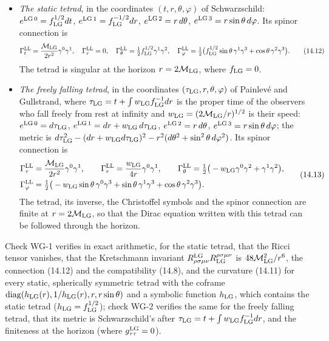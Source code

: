 \documentclass[
  10pt,
]{article}
\providecommand{\tightlist}{%
  \setlength{\itemsep}{0pt}\setlength{\parskip}{0pt}}
\begin{document}
\begin{itemize}
\tightlist
\item
  \emph{The static tetrad}, in the coordinates \((t,r,\theta,\varphi)\)
  of Schwarzschild: \(e^{{\rm LG}\,0}=f_{\rm LG}^{1/2}dt\),
  \(e^{{\rm LG}\,1}=f_{\rm LG}^{-1/2}dr\),
  \(e^{{\rm LG}\,2}=r\,d\theta\),
  \(e^{{\rm LG}\,3}=r\sin\theta\,d\varphi\). Its spinor connection is
  \[\Gamma^{\rm LL}_t=\frac{\mathcal M_{\rm LG}}{2r^2}\gamma^0\gamma^1,\quad\Gamma^{\rm LL}_r=0,\quad\Gamma^{\rm LL}_\theta=\tfrac12f_{\rm LG}^{1/2}\gamma^1\gamma^2,\quad\Gamma^{\rm LL}_\varphi=\tfrac12\big(f_{\rm LG}^{1/2}\sin\theta\,\gamma^1\gamma^3+\cos\theta\,\gamma^2\gamma^3\big).\tag{14.12}\]
  The tetrad is singular at the horizon \(r=2\mathcal M_{\rm LG}\),
  where \(f_{\rm LG}=0\).
\item
  \emph{The freely falling tetrad}, in the coordinates
  \((\tau_{\rm LG},r,\theta,\varphi)\) of Painlevé and Gullstrand, where
  \(\tau_{\rm LG}=t+\int w_{\rm LG}f_{\rm LG}^{-1}dr\) is the proper
  time of the observers who fall freely from rest at infinity and
  \(w_{\rm LG}=(2\mathcal M_{\rm LG}/r)^{1/2}\) is their speed:
  \(e^{{\rm LG}\,0}=d\tau_{\rm LG}\),
  \(e^{{\rm LG}\,1}=dr+w_{\rm LG}\,d\tau_{\rm LG}\),
  \(e^{{\rm LG}\,2}=r\,d\theta\),
  \(e^{{\rm LG}\,3}=r\sin\theta\,d\varphi\); the metric is
  \(d\tau_{\rm LG}^2-(dr+w_{\rm LG}d\tau_{\rm LG})^2-r^2(d\theta^2+\sin^2\theta\,d\varphi^2)\).
  Its spinor connection is
  \[\begin{aligned}&\Gamma^{\rm LL}_\tau=\frac{\mathcal M_{\rm LG}}{2r^2}\gamma^0\gamma^1,\qquad\Gamma^{\rm LL}_r=\frac{w_{\rm LG}}{4r}\gamma^0\gamma^1,\qquad\Gamma^{\rm LL}_\theta=\tfrac12\big(-w_{\rm LG}\gamma^0\gamma^2+\gamma^1\gamma^2\big),\\&\Gamma^{\rm LL}_\varphi=\tfrac12\big(-w_{\rm LG}\sin\theta\,\gamma^0\gamma^3+\sin\theta\,\gamma^1\gamma^3+\cos\theta\,\gamma^2\gamma^3\big).\end{aligned}\tag{14.13}\]
  The tetrad, its inverse, the Christoffel symbols and the spinor
  connection are finite at \(r=2\mathcal M_{\rm LG}\), so that the Dirac
  equation written with this tetrad can be followed through the horizon.
\end{itemize}

Check WG-1 verifies in exact arithmetic, for the static tetrad, that the
Ricci tensor vanishes, that the Kretschmann invariant
\(R^{\rm LG}_{\rho\sigma\mu\nu}R_{\rm LG}^{\rho\sigma\mu\nu}\) is
\(48\mathcal M_{\rm LG}^2/r^6\), the connection (14.12) and the
compatibility (14.8), and the curvature (14.11) for every static,
spherically symmetric tetrad with the coframe
\(\mathrm{diag}(h_{\rm LG}(r),1/h_{\rm LG}(r),r,r\sin\theta)\) and a
symbolic function \(h_{\rm LG}\), which contains the static tetrad
(\(h_{\rm LG}=f_{\rm LG}^{1/2}\)); check WG-2 verifies the same for the
freely falling tetrad, that its metric is Schwarzschild's after
\(\tau_{\rm LG}=t+\int w_{\rm LG}f_{\rm LG}^{-1}dr\), and the finiteness
at the horizon (where \(g^{\rm LG}_{\tau\tau}=0\)).
\end{document}

